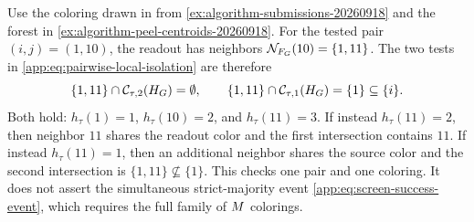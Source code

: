 \begin{example}
\label{ex:algorithm-separation-20260918}
Use the coloring drawn in  from
\cref{ex:algorithm-submissions-20260918} and the forest in
\cref{ex:algorithm-peel-centroids-20260918}.  For the tested pair
$(i,j)=(1,10)$, the readout has neighbors
$\mathcal N_{F_{G}}(10)=\{1,11\}$.  The two tests in
\eqref{app:eq:pairwise-local-isolation} are therefore
\[
 \{1,11\}\cap\mathcal C_{\tau,2}(H_{G})=\emptyset,\qquad
 \{1,11\}\cap\mathcal C_{\tau,1}(H_{G})=\{1\}\subseteq\{i\}.
\]
Both hold: $h_\tau(1)=1$, $h_\tau(10)=2$, and $h_\tau(11)=3$.
If instead $h_\tau(11)=2$, then neighbor $11$ shares the readout color
and the first intersection contains $11$.  If instead $h_\tau(11)=1$,
then an additional neighbor shares the source color and the second
intersection is $\{1,11\}\not\subseteq\{1\}$.
This checks one pair and one coloring.  It does not assert the
simultaneous strict-majority event \eqref{app:eq:screen-success-event},
which requires the full family of $M$ colorings.
\end{example}

